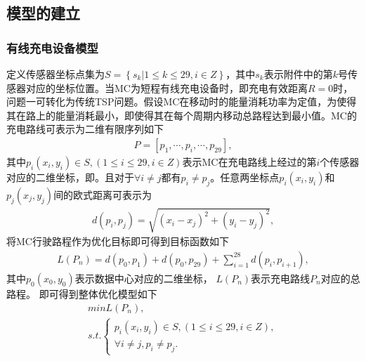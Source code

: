 \documentclass{whutmod}
\begin{document}
		
		
		\subsection{模型的建立}
			\subsubsection{有线充电设备模型}
		    定义传感器坐标点集为$S=\left \{ s_k| 1\leqslant k \leqslant 29,i\in Z\right \}$，其中$s_k$表示附件中的第$k$号传感器对应的坐标位置。当MC为短程有线充电设备时，即充电有效距离$R=0$时，问题一可转化为传统TSP问题。假设MC在移动时的能量消耗功率为定值，为使得其在路上的能量消耗最小，即使得其在每个周期内移动总路程达到最小值。MC的充电路线可表示为二维有限序列如下
		    \begin{gather}
		    P=[ p_{1},\cdots,p_{i},\cdots,p_{29} ] ,
		    \end{gather}
		     其中$p_{i}(x_i,y_i)\in S,(1\leqslant i \leqslant 29 ,i\in Z)$表示MC在充电路线上经过的第$i$个传感器对应的二维坐标，即。且对于$\forall i \neq j$都有$p_i \neq p_j $。任意两坐标点$p_i(x_i,y_i)$和$p_j(x_j,y_j)$间的欧式距离可表示为
		    \begin{gather*}
		    d(p_i,p_j)=\sqrt{(x_i-x_j)^2+(y_i-y_j)^2},
		    \end{gather*}
		      将MC行驶路程作为优化目标即可得到目标函数如下
		    \begin{gather*}
		    L(P_n)=d(p_0,p_{1})+d(p_0,p_{29})+\sum_{i=1}^{28}d(p_i,p_{i+1}) ,
		    \end{gather*}
		    其中$p_0(x_0,y_0)$表示数据中心对应的二维坐标， $L(P_n)$表示充电路线$P_n$对应的总路程。 即可得到整体优化模型如下 \begin{gather}
		    min L(P_n) ,\\
		    s.t.\left\{\begin{matrix}p_{i}(x_i,y_i)\in S,(1\leqslant i \leqslant 29 ,i\in Z),
		    \\ \forall i \neq j,p_i \neq p_j .
		    \end{matrix}\right.
		    \end{gather}
\end{document}

